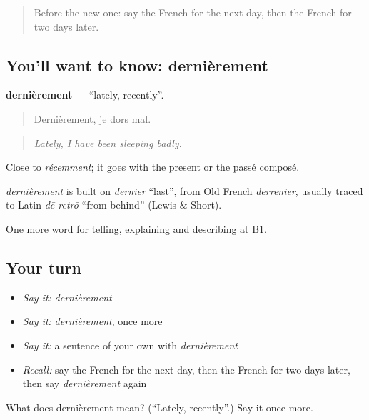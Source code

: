 \begin{quote}
Before the new one: say the French for the next day, then the French for two days later.
\end{quote}

\subsection*{You'll want to know: dernièrement}
\textbf{dernièrement} — \textquotedblleft{}lately, recently\textquotedblright{}.

\begin{quote}
Dernièrement, je dors mal.
\end{quote}

\begin{quote}
\emph{Lately, I have been sleeping badly.}
\end{quote}

Close to \emph{récemment}; it goes with the present or the passé composé.

\begin{cousinweb}
\emph{dernièrement} is built on \emph{dernier} \textquotedblleft{}last\textquotedblright{}, from Old French \emph{derrenier}, usually traced to Latin \emph{dē retrō} \textquotedblleft{}from behind\textquotedblright{} (Lewis \& Short).
\end{cousinweb}

\begin{grammarlens}[title={What you've built}]
One more word for telling, explaining and describing at B1.
\end{grammarlens}

\subsection*{Your turn}
\begin{itemize}
\raggedright
  \item \emph{Say it:} \emph{dernièrement}
  \item \emph{Say it:} \emph{dernièrement}, once more
  \item \emph{Say it:} a sentence of your own with \emph{dernièrement}
  \item \emph{Recall:} say the French for the next day, then the French for two days later, then say \emph{dernièrement} again
\end{itemize}

\begin{tcolorbox}[breakable,colback=teal!4,colframe=teal!35!black,title={Before you move on}]
What does dernièrement mean? (\textquotedblleft{}Lately, recently\textquotedblright{}.) Say it once more.
\end{tcolorbox}
